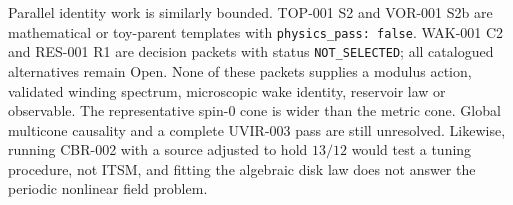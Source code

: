 Parallel identity work is similarly bounded.  TOP-001 S2 and VOR-001 S2b are
mathematical or toy-parent templates with \texttt{physics\_pass: false}.
WAK-001 C2 and RES-001 R1 are decision packets with status
\texttt{NOT\_SELECTED}; all catalogued alternatives remain Open.  None of
these packets supplies a modulus action, validated winding spectrum,
microscopic wake identity, reservoir law or observable.  The representative
spin-0 cone is wider than the
metric cone.  Global multicone causality and a complete UVIR-003 pass are still
unresolved.  Likewise, running CBR-002 with a source adjusted to hold
$13/12$ would test a tuning procedure, not ITSM, and fitting the algebraic
disk law does not answer the periodic nonlinear field problem.

